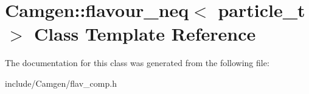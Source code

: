\hypertarget{a00228}{\section{Camgen\-:\-:flavour\-\_\-neq$<$ particle\-\_\-t $>$ Class Template Reference}
\label{a00228}
}


The documentation for this class was generated from the following file\-:\begin{DoxyCompactItemize}
\item 
include/\-Camgen/flav\-\_\-comp.\-h\end{DoxyCompactItemize}
